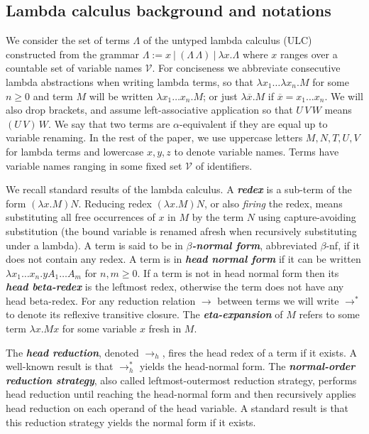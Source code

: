 \documentclass[xchauthor,chkrefs,GCNS,amsmath,amsthm,rotating,leaveRGB]{tcsg}
\renewcommand{\index}[1]{}
\theoremstyle{plain}
\theoremstyle{definition}
\newcommand{\VarSet}{\mathcal{V}}
\begin{document}
\subsection{Lambda calculus background and notations}\label{sec:lambdacalculus_basics}

We consider the set of terms $\Lambda $ of the untyped lambda calculus (ULC)
constructed from the grammar $\Lambda := x\ |\ (\Lambda \, \Lambda )\ |\
\lambda x. \Lambda $ where $x$ ranges over a countable set of variable names
$\VarSet $. For conciseness we abbreviate consecutive lambda abstractions
when writing lambda terms, so that $\lambda x_{1} \ldots \lambda x_{n} . M$
for some $n\geq 0$ and term $M$ will be written $\lambda x_{1} \ldots x_{n} .
M$; or just $\lambda \overline{x} . M$ if $\overline{x} = x_{1} \ldots
x_{n}$. We will also drop brackets, and assume left-associative application
so that $U\,V\,W$ means $(U\,V)\,W$. We say that two terms are $\alpha
$-equivalent if they are equal up to variable renaming. In the rest of the
paper, we use uppercase letters $M, N, T, U, V$ for lambda terms and
lowercase $x,y,z$ to denote variable names. Terms have variable names ranging
in some fixed set $\VarSet $ of identifiers.

We recall standard results of the lambda calculus. A
\textbf{\emph{redex}}\index{redex} is a sub-term of the form $(\lambda x. M)
N$. Reducing redex $(\lambda x. M) N$, or also \emph{firing} the redex, means
substituting all free occurrences of $x$ in $M$ by the term $N$ using
capture-avoiding substitution (the bound variable is renamed afresh when
recursively substituting under a lambda). A term is said to be in
\textbf{\emph{$\beta  $-normal form}}\index{$\beta  $-normal form},
abbreviated $\beta $-nf, if it does not contain any redex. A term is in
\textbf{\emph{head normal form}}\index{head normal form} if it can be written
$\lambda x_{1} \ldots x_{n} . y A_{1} \ldots A_{m}$ for $n,m\geq 0$. If a
term is not in head normal form then its \textbf{\emph{head
beta-redex}}\index{head beta-redex} is the leftmost redex, otherwise the term
does not have any head beta-redex. For any reduction relation $\rightarrow $
between terms we will write $\rightarrow ^{*}$ to denote its reflexive
transitive closure. The \textbf{\emph{eta-expansion}}\index{eta-expansion} of
$M$ refers to some term $\lambda x. M x $ for some variable $x$ fresh in $M$.

The \textbf{\emph{head reduction}}\index{head reduction}, denoted
$\rightarrow _{h}$, fires the head redex of a term if it exists. A well-known
result is that $\rightarrow ^{*}_{h}$ yields the head-normal form. The
\textbf{\emph{normal-order reduction strategy}}\index{normal-order reduction
strategy}, also called leftmost-outermost reduction strategy, performs head
reduction until reaching the head-normal form and then recursively applies
head reduction on each operand of the head variable. A standard result is
that this reduction strategy yields the normal form if it exists.
\end{document}
